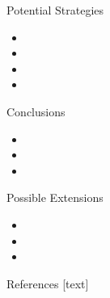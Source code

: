 \documentclass[final]{beamer}\usepackage[]{graphicx}\usepackage[]{color}
\begin{document}
\begin{frame}[fragile]
\begin{columns}[t]
\begin{column}{0.23\linewidth}
\begin{minipage}[t][.955\textheight]{\linewidth}
\vspace{0ex}
\begin{block}{Potential Strategies}
\vspace{0ex}
\begin{itemize}
\item
\item
\item
\item
\end{itemize}
\vspace{0ex}
\vfill
\end{block}
\vfill

\begin{block}{Conclusions}
\begin{itemize}
\item
\item
\item
\end{itemize}
\vspace{0ex}
\vfill
\end{block}
\vfill

\begin{block}{Possible Extensions}
\begin{itemize}
\item  
\item  
\item  
\end{itemize}
\vspace{0ex}
\vfill
\end{block}
\vfill

\begin{block}{References}
\footnotesize
{}[text]
\vspace{-1ex}



\normalsize
\vfill
\end{block} 
\vfill

\end{minipage}
\end{column}%


\end{columns}
\end{frame}
\end{document}
